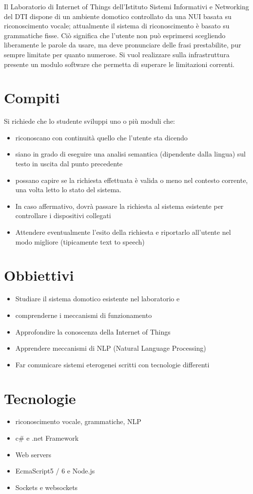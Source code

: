 \documentclass[twoside]{supsistudent}
\begin{document}
Il Laboratorio di Internet of Things dell'Istituto Sistemi Informativi 
e Networking del DTI dispone di un ambiente
domotico controllato da una NUI basata su riconoscimento vocale; 
attualmente il sistema di riconoscimento è basato su
grammatiche fisse. Ciò significa che l'utente non può esprimersi 
scegliendo liberamente le parole da usare, ma deve
pronunciare delle frasi prestabilite,
 pur sempre limitate per quanto numerose.
Si vuol realizzare sulla infrastruttura presente un modulo
 software che permetta di superare le limitazioni correnti.
\section*{Compiti}
Si richiede che lo studente sviluppi uno o più moduli che:
\begin{itemize}
\item riconoscano con continuità quello che l'utente sta dicendo
\item siano in grado di eseguire una analisi semantica (dipendente dalla lingua) 
sul testo in uscita dal punto precedente
\item possano capire se la richiesta effettuata è valida o meno nel contesto 
corrente, una volta letto lo stato del
sistema.
\item In caso affermativo, dovrà passare la richiesta al sistema esistente 
per controllare i dispositivi collegati
\item Attendere eventualmente l'esito della richiesta e riportarlo all'utente 
nel modo migliore (tipicamente text to speech)
\end{itemize}
\section*{Obbiettivi}
\begin{itemize}
\item Studiare il sistema domotico esistente nel laboratorio e 
\item comprenderne i meccanismi di funzionamento
\item Approfondire la conoscenza della Internet of Things
\item Apprendere meccanismi di NLP (Natural Language Processing)
\item Far comunicare sistemi eterogenei scritti con tecnologie differenti
\end{itemize}
\section*{Tecnologie}
\begin{itemize}
\item riconoscimento vocale, grammatiche, NLP
\item c\# e .net Framework
\item Web servers
\item EcmaScript5 / 6 e Node.js
\item Sockets e websockets
\end{itemize}
\end{document}
